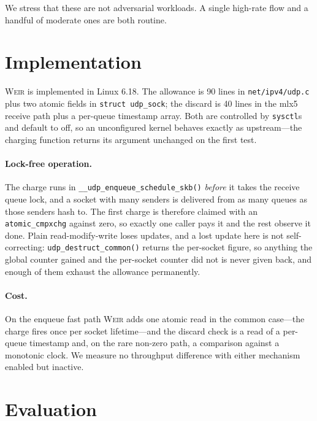 \documentclass[letterpaper,twocolumn,10pt]{article}
\newcommand{\sys}{\textsc{Weir}\xspace}
\begin{document}
We stress that these are not adversarial workloads. A single high-rate flow and
a handful of moderate ones are both routine.





\section{Implementation}

\sys is implemented in Linux 6.18. The allowance is 90 lines in
\texttt{net/ipv4/udp.c} plus two atomic fields in \texttt{struct udp\_sock}; the
discard is 40 lines in the mlx5 receive path plus a per-queue timestamp array.
Both are controlled by \texttt{sysctl}s and default to off, so an unconfigured
kernel behaves exactly as upstream---the charging function returns its argument
unchanged on the first test.

\paragraph{Lock-free operation.} The charge runs in
\texttt{\_\_udp\_enqueue\_schedule\_skb()} \emph{before} it takes the receive
queue lock, and a socket with many senders is delivered from as many queues as
those senders hash to. The first charge is therefore claimed with an
\texttt{atomic\_cmpxchg} against zero, so exactly one caller pays it and the
rest observe it done. Plain read-modify-write loses updates, and a lost update
here is not self-correcting: \texttt{udp\_destruct\_common()} returns the
per-socket figure, so anything the global counter gained and the per-socket
counter did not is never given back, and enough of them exhaust the allowance
permanently.

\paragraph{Cost.} On the enqueue fast path \sys adds one atomic read in the
common case---the charge fires once per socket lifetime---and the discard check
is a read of a per-queue timestamp and, on the rare non-zero path, a comparison
against a monotonic clock. We measure no throughput difference with either
mechanism enabled but inactive.

\section{Evaluation}
\label{sec:eval}
\end{document}

